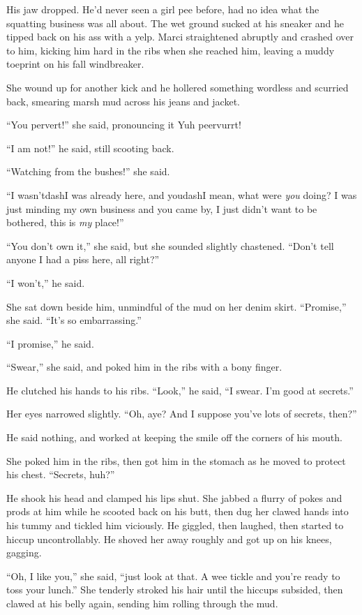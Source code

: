 His jaw dropped.  He'd never seen a girl pee before, had no idea what
the squatting business was all about.  The wet ground sucked at his
sneaker and he tipped back on his ass with a yelp.  Marci straightened
abruptly and crashed over to him, kicking him hard in the ribs when
she reached him, leaving a muddy toeprint on his fall windbreaker.

She wound up for another kick and he hollered something wordless and
scurried back, smearing marsh mud across his jeans and jacket.

``You pervert!'' she said, pronouncing it Yuh peervurrt!

``I am not!'' he said, still scooting back.

``Watching from the bushes!'' she said.

``I wasn'tdash{}I was already here, and youdash{}I mean, what were
\textit{you} doing?  I was just minding my own business and you came
by, I just didn't want to be bothered, this is \textit{my} place!''

``You don't own it,'' she said, but she sounded slightly chastened. 
``Don't tell anyone I had a piss here, all right?''

``I won't,'' he said.

She sat down beside him, unmindful of the mud on her denim skirt. 
``Promise,'' she said.  ``It's so embarrassing.''

``I promise,'' he said.

``Swear,'' she said, and poked him in the ribs with a bony finger.

He clutched his hands to his ribs.  ``Look,'' he said, ``I swear.  I'm
good at secrets.''

Her eyes narrowed slightly.  ``Oh, aye?  And I suppose you've lots of
secrets, then?''

He said nothing, and worked at keeping the smile off the corners of
his mouth.

She poked him in the ribs, then got him in the stomach as he moved to
protect his chest.  ``Secrets, huh?''

He shook his head and clamped his lips shut.  She jabbed a flurry of
pokes and prods at him while he scooted back on his butt, then dug her
clawed hands into his tummy and tickled him viciously.  He giggled,
then laughed, then started to hiccup uncontrollably.  He shoved her
away roughly and got up on his knees, gagging.

``Oh, I like you,'' she said, ``just look at that.  A wee tickle and
you're ready to toss your lunch.'' She tenderly stroked his hair until
the hiccups subsided, then clawed at his belly again, sending him
rolling through the mud.

